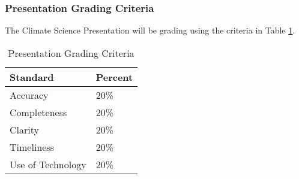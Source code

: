 
\subsubsection{Presentation Grading Criteria}

The Climate Science Presentation will be grading using the criteria in Table \ref{tab:presentationgrading}.

\begin{table}[h]
\centering
\caption{Presentation Grading Criteria}
\label{tab:presentationgrading}
\begin{tabular}{ll}\hline
Standard            & Percent \\ \hline\hline    
Accuracy            & 20\%  \\
Completeness        & 20\% \\
Clarity             & 20\% \\
Timeliness          & 20\% \\
Use of Technology   & 20\% \\ \hline
\end{tabular}
\end{table}